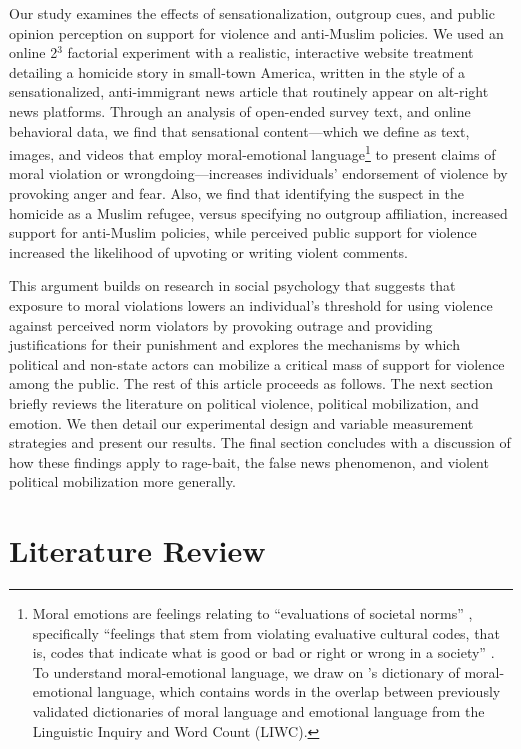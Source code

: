 Our study examines the effects of sensationalization, outgroup cues, and public opinion perception on support for violence and anti-Muslim policies. We used an online 2$^3$ factorial experiment with a realistic, interactive website treatment detailing a homicide story in small-town America, written in the style of a sensationalized, anti-immigrant news article that routinely appear on alt-right news platforms. Through an analysis of open-ended survey text, and online behavioral data, we find that sensational content---which we define as text, images, and videos that employ moral-emotional language\footnote{Moral emotions are feelings relating to ``evaluations of societal norms'' \citep{brady2017emotion}, specifically ``feelings that stem from violating evaluative cultural codes, that is, codes that indicate what is good or bad or right or wrong in a society'' \citep{stets2012current}. To understand moral-emotional language, we draw on \citep{brady2017emotion}'s dictionary of moral-emotional language, which contains words in the overlap between previously validated dictionaries of moral language and emotional language from the Linguistic Inquiry and Word Count (LIWC).} to present claims of moral violation or wrongdoing---increases individuals' endorsement of violence by provoking anger and fear. Also, we find that identifying the suspect in the homicide as a Muslim refugee, versus specifying no outgroup affiliation, increased support for anti-Muslim policies, while perceived public support for violence increased the likelihood of upvoting or writing violent comments. 

This argument builds on research in social psychology that suggests that exposure to moral violations lowers an individual's threshold for using violence against perceived norm violators by provoking outrage and providing justifications for their punishment \citep{baumeister1999evil,beck1999prisoners,crockett2017moral, fiske2014virtuous, goldberg1999rage} and explores the mechanisms by which political and non-state actors can mobilize a critical mass of support for violence among the public. The rest of this article proceeds as follows. The next section briefly reviews the literature on political violence, political mobilization, and emotion. We then detail our experimental design and variable measurement strategies and present our results. The final section concludes with a discussion of how these findings apply to rage-bait, the false news phenomenon, and violent political mobilization more generally.

\section{Literature Review}

